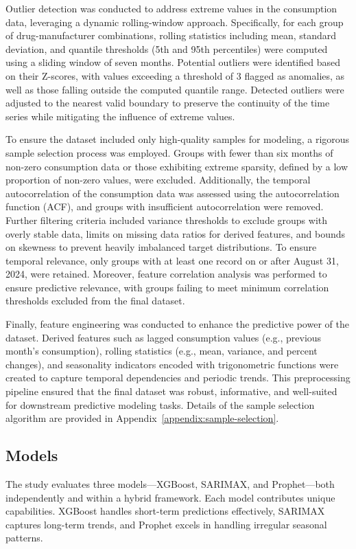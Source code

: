 \documentclass[journal]{IEEEtran}
\begin{document}
Outlier detection was conducted to address extreme values in the consumption data, leveraging a dynamic rolling-window approach. Specifically, for each group of drug-manufacturer combinations, rolling statistics including mean, standard deviation, and quantile thresholds (5th and 95th percentiles) were computed using a sliding window of seven months. Potential outliers were identified based on their Z-scores, with values exceeding a threshold of 3 flagged as anomalies, as well as those falling outside the computed quantile range. Detected outliers were adjusted to the nearest valid boundary to preserve the continuity of the time series while mitigating the influence of extreme values.

To ensure the dataset included only high-quality samples for modeling, a rigorous sample selection process was employed. Groups with fewer than six months of non-zero consumption data or those exhibiting extreme sparsity, defined by a low proportion of non-zero values, were excluded. Additionally, the temporal autocorrelation of the consumption data was assessed using the autocorrelation function (ACF), and groups with insufficient autocorrelation were removed. Further filtering criteria included variance thresholds to exclude groups with overly stable data, limits on missing data ratios for derived features, and bounds on skewness to prevent heavily imbalanced target distributions. To ensure temporal relevance, only groups with at least one record on or after August 31, 2024, were retained. Moreover, feature correlation analysis was performed to ensure predictive relevance, with groups failing to meet minimum correlation thresholds excluded from the final dataset.

Finally, feature engineering was conducted to enhance the predictive power of the dataset. Derived features such as lagged consumption values (e.g., previous month’s consumption), rolling statistics (e.g., mean, variance, and percent changes), and seasonality indicators encoded with trigonometric functions were created to capture temporal dependencies and periodic trends. This preprocessing pipeline ensured that the final dataset was robust, informative, and well-suited for downstream predictive modeling tasks. Details of the sample selection algorithm are provided in Appendix~\ref{appendix:sample-selection}.

\subsection{Models}
The study evaluates three models—XGBoost, SARIMAX, and Prophet—both independently and within a hybrid framework. Each model contributes unique capabilities. XGBoost handles short-term predictions effectively, SARIMAX captures long-term trends, and Prophet excels in handling irregular seasonal patterns.
\end{document}

